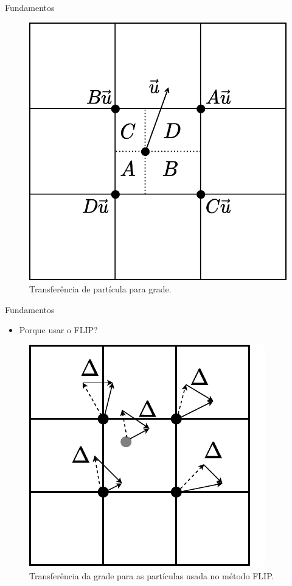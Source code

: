 \documentclass[aspectratio=169,xcolor=dvipsnames]{beamer}
\begin{document}
\begin{frame}{Fundamentos}
    \begin{figure}
        \centering
        \includegraphics[width=0.4\linewidth]{figures/Particle2Grid.pdf}
        \caption{Transferência de partícula para grade.}
        \label{fig:particle2grid}
    \end{figure}
\end{frame}

\begin{frame}{Fundamentos}
    \begin{itemize}
        \item Porque usar o FLIP?
    \end{itemize}
    \begin{figure}
        \centering
        \includegraphics[width=0.4\linewidth]{figures/Grid2Particle.pdf}
        \caption{Transferência da grade para as partículas usada no método FLIP.}
        \label{fig:deltatransfer}
    \end{figure}

\end{frame}
\end{document}
